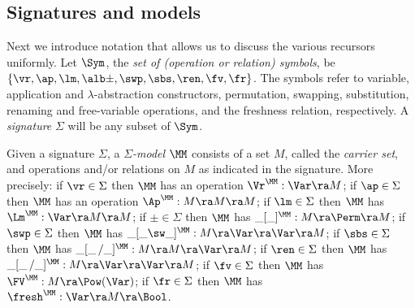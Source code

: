 \vspace*{-0.5ex}\subsection{Signatures and models}
\label{subsec-sigMod}

Next we introduce %
notation that allows us to discuss the various recursors uniformly. 
%
Let $\Sym$, the \emph{set of (operation or relation) symbols}, be 
$\{\vr,\ap,\lm,\alb\pm,\swp,\sbs,\ren,\fv,\fr\}$.  The symbols refer to variable, application and $\lambda$-abstraction constructors, permutation, swapping, substitution, renaming and free-variable operations, and the freshness relation, respectively. 
%
A \emph{signature} $\Sigma$ will be any  subset of $\Sym$. 
%

Given a signature $\Sigma$, a \emph{$\Sigma$-model} $\MM$ consists of a set $M$, called the \emph{carrier set}, and operations and/or relations on $M$ as indicated in the signature. 
%
More precisely: 
	if $\vr \in \Sigma$ 
	then $\MM$ has an operation $\Vr^\MM : \Var \ra M$; 
	if $\ap \in \Sigma$ 
	then $\MM$ has an operation  $\Ap^\MM : M \ra M \ra M$; 
	if $\lm \in \Sigma$ 
	then $\MM$ has %
	$\Lm^\MM : \Var \ra M \ra M$; 
	if $\pm \in \Sigma$ 
	then $\MM$ has %
	$\_[\_]^\MM : M \ra \Perm \ra M$; 
if $\swp \in \Sigma$  
	then $\MM$ has %
	$\_[\_\sw \_]^\MM : M \ra \Var \ra \Var \ra M$; 
	if $\sbs \in \Sigma$ 
	then $\MM$ has %
	$\_[\_ \,/ \_]^\MM : M \ra M \ra \Var \ra M$; 
if $\ren \in \Sigma$ 
then $\MM$ has %
$\_[\_ \,/ \_]^\MM : M \ra \Var \ra \Var \ra M$; 
if $\fv \in \Sigma$ 
then %
$\MM$ has %
$\FV^\MM : M \ra \Pow(\Var)$; 
if $\fr \in \Sigma$ 
then %
$\MM$ has %
$\fresh^\MM : \Var \ra M \ra \Bool$.  

